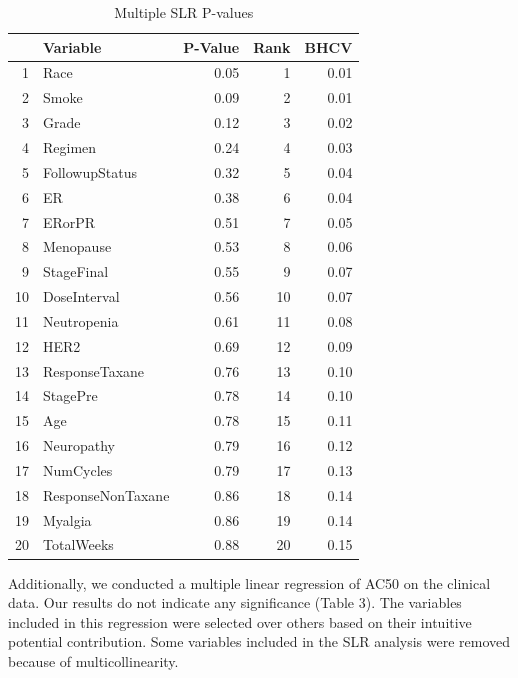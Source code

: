 \documentclass[12pt]{article}
\begin{document}
\begin{table}[ht]
\caption{Multiple SLR P-values}
\centering
\begin{tabular}{rlrrr}
  \hline
 & Variable & P-Value & Rank & BHCV \\ 
  \hline
1 & Race & 0.05 &   1 & 0.01 \\ 
  2 & Smoke & 0.09 &   2 & 0.01 \\ 
  3 & Grade & 0.12 &   3 & 0.02 \\ 
  4 & Regimen & 0.24 &   4 & 0.03 \\ 
  5 & FollowupStatus & 0.32 &   5 & 0.04 \\ 
  6 & ER & 0.38 &   6 & 0.04 \\ 
  7 & ERorPR & 0.51 &   7 & 0.05 \\ 
  8 & Menopause & 0.53 &   8 & 0.06 \\ 
  9 & StageFinal & 0.55 &   9 & 0.07 \\ 
  10 & DoseInterval & 0.56 &  10 & 0.07 \\ 
  11 & Neutropenia & 0.61 &  11 & 0.08 \\ 
  12 & HER2 & 0.69 &  12 & 0.09 \\ 
  13 & ResponseTaxane & 0.76 &  13 & 0.10 \\ 
  14 & StagePre & 0.78 &  14 & 0.10 \\ 
  15 & Age & 0.78 &  15 & 0.11 \\ 
  16 & Neuropathy & 0.79 &  16 & 0.12 \\ 
  17 & NumCycles & 0.79 &  17 & 0.13 \\ 
  18 & ResponseNonTaxane & 0.86 &  18 & 0.14 \\ 
  19 & Myalgia & 0.86 &  19 & 0.14 \\ 
  20 & TotalWeeks & 0.88 &  20 & 0.15 \\ 
   \hline
\end{tabular}
\end{table}

Additionally, we conducted a multiple linear regression of AC50 on the clinical data. Our results do not indicate any significance (Table 3). The variables included in this regression were selected over others based on their intuitive potential contribution. Some variables included in the SLR analysis were removed because of multicollinearity.
\end{document}

